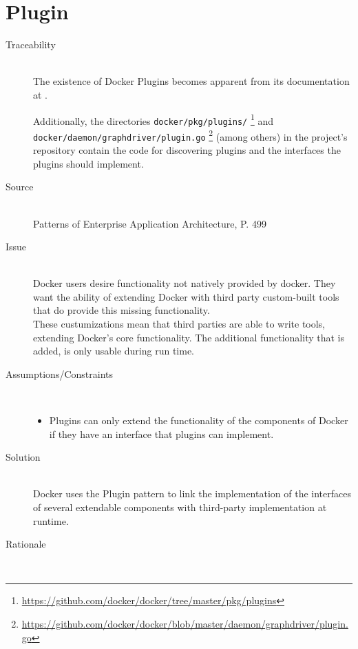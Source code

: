 \section{Plugin}
\label{sec:pattern-plugin}
\begin{description}

\item [Traceability]~\\
The existence of Docker Plugins becomes apparent from its documentation at \cite{dockerplugindocs}.

Additionally, the directories \verb|docker/pkg/plugins/| \footnote{\url{https://github.com/docker/docker/tree/master/pkg/plugins}} and \verb|  docker/daemon/graphdriver/plugin.go| \footnote{\url{https://github.com/docker/docker/blob/master/daemon/graphdriver/plugin.go}} (among others) in the project's repository contain the code for discovering plugins and the interfaces the plugins should implement.

\item [Source]~\\
Patterns of Enterprise Application Architecture, P. 499 \cite{eaa}

\item [Issue]~\\
Docker users desire functionality not natively provided by docker. They want the ability of extending Docker with third party custom-built tools that do provide this missing functionality. \\
These custumizations mean that third parties are able to write tools, extending Docker's core functionality\cite{dockerpluginblog}.
The additional functionality that is added, is only usable during run time.


\item [Assumptions/Constraints]~
\begin{itemize}
\item Plugins can only extend the functionality of the components of Docker if they have an interface that plugins can implement.
\end{itemize}

\item [Solution]~\\
Docker uses the Plugin pattern to link the implementation of the interfaces of several extendable components with third-party implementation at runtime.

\item [Rationale] ~\\ %


\end{description}
